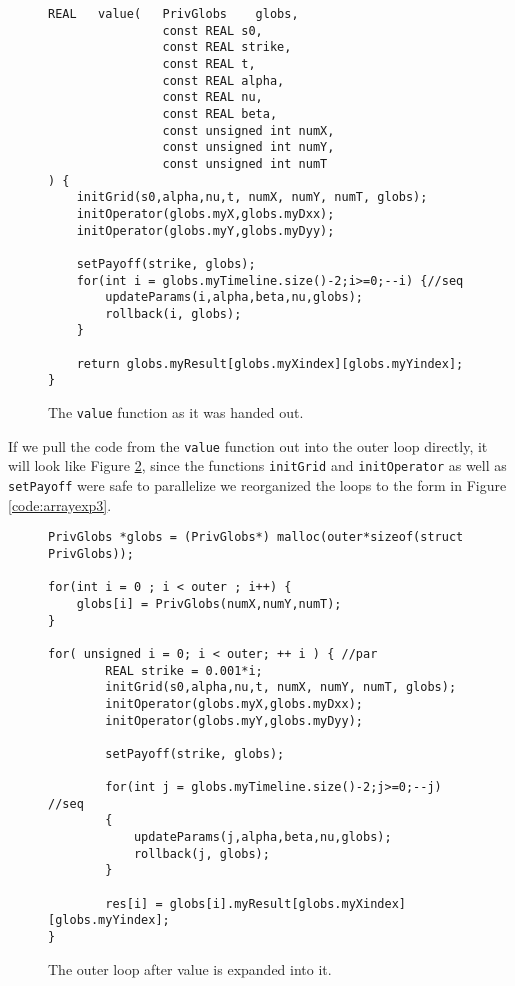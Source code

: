\begin{figure}[H]
    \begin{lstlisting}
REAL   value(   PrivGlobs    globs,
                const REAL s0,
                const REAL strike,
                const REAL t,
                const REAL alpha,
                const REAL nu,
                const REAL beta,
                const unsigned int numX,
                const unsigned int numY,
                const unsigned int numT
) {
    initGrid(s0,alpha,nu,t, numX, numY, numT, globs);
    initOperator(globs.myX,globs.myDxx);
    initOperator(globs.myY,globs.myDyy);

    setPayoff(strike, globs);
    for(int i = globs.myTimeline.size()-2;i>=0;--i) {//seq
        updateParams(i,alpha,beta,nu,globs);
        rollback(i, globs);
    }

    return globs.myResult[globs.myXindex][globs.myYindex];
}
    \end{lstlisting}
    \caption{The \texttt{value} function as it was handed out.}
    \label{code:predistvalue}
\end{figure}

If we pull the code from the \texttt{value} function out into the outer loop
directly, it will look like Figure \ref{code:arrayexp2}, since the functions
\texttt{initGrid} and \texttt{initOperator} as well as \texttt{setPayoff} were
safe to parallelize we reorganized the loops to the form in Figure
\ref{code:arrayexp3}.

\begin{figure}[H]
    \begin{lstlisting}
PrivGlobs *globs = (PrivGlobs*) malloc(outer*sizeof(struct PrivGlobs));

for(int i = 0 ; i < outer ; i++) {
    globs[i] = PrivGlobs(numX,numY,numT);
}

for( unsigned i = 0; i < outer; ++ i ) { //par
        REAL strike = 0.001*i;
        initGrid(s0,alpha,nu,t, numX, numY, numT, globs);
        initOperator(globs.myX,globs.myDxx);
        initOperator(globs.myY,globs.myDyy);

        setPayoff(strike, globs);

        for(int j = globs.myTimeline.size()-2;j>=0;--j) //seq
        {
            updateParams(j,alpha,beta,nu,globs);
            rollback(j, globs);
        }

        res[i] = globs[i].myResult[globs.myXindex][globs.myYindex];
}
    \end{lstlisting}
    \caption{The outer loop after value is expanded into it.}
    \label{code:arrayexp2}
\end{figure}

